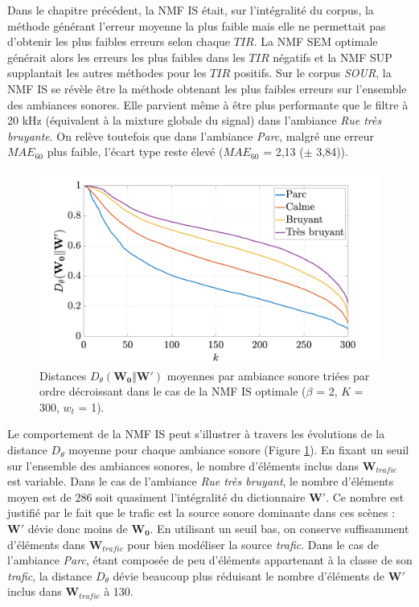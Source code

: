 Dans le chapitre précédent, la NMF IS était, sur l'intégralité du corpus, la méthode générant l'erreur moyenne la plus faible mais elle ne permettait pas d'obtenir les plus faibles erreurs selon chaque $TIR$. La NMF SEM optimale générait alors les erreurs les plus faibles dans les $TIR$ négatifs et la NMF SUP supplantait les autres méthodes pour les $TIR$ positifs. 
Sur le corpus \textit{SOUR}, la NMF IS se révèle être la méthode obtenant les plus faibles erreurs sur l'ensemble des ambiances sonores. Elle parvient même à être plus performante que le filtre à 20 kHz (équivalent à la mixture globale du signal) dans l'ambiance \textit{Rue très bruyante}. On relève toutefois que dans l'ambiance \textit{Parc}, malgré une erreur $MAE_{60}$ plus faible, l'écart type reste élevé ($MAE_{60}$ = 2,13 ($\pm$ 3,84)).

\begin{figure}[h]
\centering
\includegraphics[width=.7\linewidth]{./figures/resultats/dist_grafic.pdf}
\caption{Distances $D_{\theta}(\mathbf{W_0}\Vert \mathbf{W'})$ moyennes par ambiance sonore triées par ordre décroissant  dans le cas de la NMF IS optimale ($\beta$ = 2, $K$ = 300, $w_t$ = 1).}
\label{fig:dist_grafic}
\end{figure}

Le comportement de la NMF IS peut s'illustrer à travers les évolutions de la distance $D_{\theta}$ moyenne pour chaque ambiance sonore (Figure \ref{fig:dist_grafic}).
En fixant un seuil sur l'ensemble des ambiances sonores, le nombre d'éléments inclus dans $\mathbf{W}_{trafic}$ est variable. 
Dans le cas de l'ambiance \textit{Rue très bruyant}, le nombre d'éléments moyen est de 286 soit quasiment l'intégralité du dictionnaire $\mathbf{W'}$. Ce nombre est justifié par le fait que le trafic est la source sonore dominante dans ces scènes : $\mathbf{W'}$ dévie donc moins de $\mathbf{W_0}$. En utilisant un seuil bas, on conserve suffisamment d'éléments dans $\mathbf{W}_{trafic}$ pour bien modéliser la source \textit{trafic}.
Dans le cas de l'ambiance \textit{Parc}, étant composée de peu d'éléments appartenant à la classe de son \textit{trafic}, la distance $D_{\theta}$ dévie beaucoup plus réduisant le nombre d'éléments de $\mathbf{W'}$ inclus dans $\mathbf{W}_{trafic}$ à 130.

